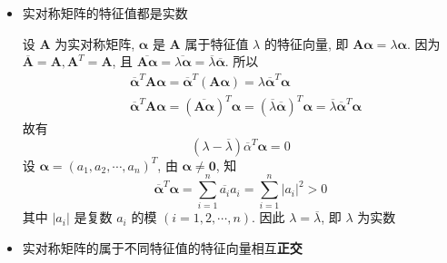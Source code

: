 \documentclass{article}
\begin{document}
				\begin{itemize}
					\item 实对称矩阵的特征值都是实数

					设 $\boldsymbol{A}$ 为实对称矩阵, $\boldsymbol{\alpha}$ 是 $\boldsymbol{A}$ 属于特征值 $\lambda$ 的特征向量, 即 $\boldsymbol{A} \boldsymbol{\alpha}=\lambda \boldsymbol{\alpha}$.
					因为 $\overline{\boldsymbol{A}}=\boldsymbol{A}, \boldsymbol{A}^{T}=\boldsymbol{A}$, 且 $\overline{\boldsymbol{A} \boldsymbol{\alpha}}=\overline{\lambda \boldsymbol{\alpha}}=\overline{\lambda} \overline{\boldsymbol{\alpha}}$. 所以
					$$
					\begin{aligned}
						&\overline{\boldsymbol{\alpha}}^{T} \boldsymbol{A} 	\boldsymbol{\alpha}=\overline{\boldsymbol{\alpha}}^{T}(\boldsymbol{A} \boldsymbol{\alpha})=\lambda \overline{\boldsymbol{\alpha}}^{T} \boldsymbol{\alpha} \\
						&\overline{\boldsymbol{\alpha}}^{T} \boldsymbol{A} 	\boldsymbol{\alpha}=(\overline{\boldsymbol{A} \boldsymbol{\alpha}})^{T} \boldsymbol{\alpha}=(\overline{\lambda}\overline{\boldsymbol{\alpha}})^{T} \boldsymbol{\alpha}=\overline{\lambda}\overline{\boldsymbol{\alpha}}^{T} \boldsymbol{\alpha}
					\end{aligned}
					$$
					故有
					$$
					(\lambda-\overline{\lambda}) \overline{\alpha}^{T} \boldsymbol{\alpha}=0
					$$
					设 $\boldsymbol{\alpha}=\left(a_{1}, a_{2}, \cdots, a_{n}\right)^{T}$, 由 $\boldsymbol{\alpha} \neq \mathbf{0}$, 知
					$$
					\overline{\boldsymbol{\alpha}}^{T} \boldsymbol{\alpha}=\sum_{i=1}^{n} \overline{a_{i}} 	a_{i}=\sum_{i=1}^{n}\left|a_{i}\right|^{2}>0
					$$
					其中 $\left|a_{i}\right|$ 是复数 $a_{i}$ 的模 $(i=1,2, \cdots, n)$. 因此 $\lambda=\overline{\lambda}$, 即 $\lambda$ 为实数
					\item 实对称矩阵的属于不同特征值的特征向量相互\textbf{正交}


\end{itemize}
\end{document}
